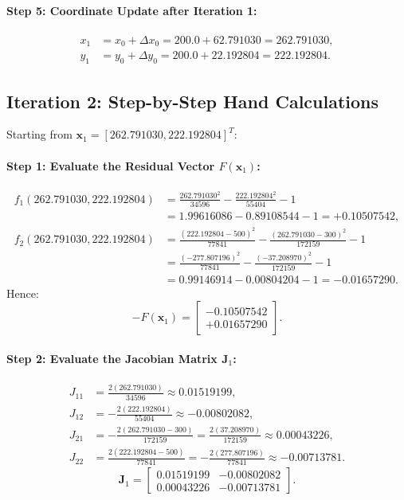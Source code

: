 \documentclass[11pt,a4paper]{article}
\begin{document}
\paragraph{Step 5: Coordinate Update after Iteration 1:}
\begin{align*}
    x_1 &= x_0 + \Delta x_0 = 200.0 + 62.791030 = 262.791030, \\
    y_1 &= y_0 + \Delta y_0 = 200.0 + 22.192804 = 222.192804.
\end{align*}

\subsection{Iteration 2: Step-by-Step Hand Calculations}
Starting from $\mathbf{x}_1 = [262.791030, 222.192804]^T$:

\paragraph{Step 1: Evaluate the Residual Vector $F(\mathbf{x}_1)$:}
\begin{align*}
    f_1(262.791030, 222.192804) &= \frac{262.791030^2}{34596} - \frac{222.192804^2}{55404} - 1 \\
    &= 1.99616086 - 0.89108544 - 1 = +0.10507542, \\
    f_2(262.791030, 222.192804) &= \frac{(222.192804 - 500)^2}{77841} - \frac{(262.791030 - 300)^2}{172159} - 1 \\
    &= \frac{(-277.807196)^2}{77841} - \frac{(-37.208970)^2}{172159} - 1 \\
    &= 0.99146914 - 0.00804204 - 1 = -0.01657290.
\end{align*}
Hence:
\begin{equation*}
    -F(\mathbf{x}_1) = 
    \begin{bmatrix}
        -0.10507542 \\
        +0.01657290
    \end{bmatrix}.
\end{equation*}

\paragraph{Step 2: Evaluate the Jacobian Matrix $\mathbf{J}_1$:}
\begin{align*}
    J_{11} &= \frac{2(262.791030)}{34596} \approx 0.01519199, \\
    J_{12} &= -\frac{2(222.192804)}{55404} \approx -0.00802082, \\
    J_{21} &= -\frac{2(262.791030 - 300)}{172159} = \frac{2(37.208970)}{172159} \approx 0.00043226, \\
    J_{22} &= \frac{2(222.192804 - 500)}{77841} = -\frac{2(277.807196)}{77841} \approx -0.00713781.
\end{align*}
\begin{equation*}
    \mathbf{J}_1 = 
    \begin{bmatrix}
        0.01519199 & -0.00802082 \\
        0.00043226 & -0.00713781
    \end{bmatrix}.
\end{equation*}
\end{document}
